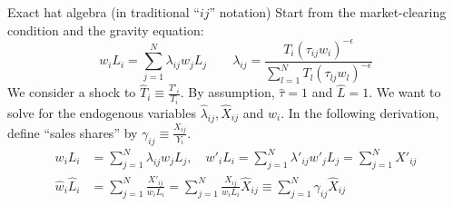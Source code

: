 \documentclass[10pt,notes=hide]{beamer}
\begin{document}
\begin{frame}{Exact hat algebra (in traditional ``$ij$'' notation)}
Start from the market-clearing condition and the gravity equation:
\begin{equation*}
w_i L_i
=
\sum_{j=1}^{N} \lambda_{ij} w_j L_j 
\quad \quad
\lambda_{ij} 
=
\frac{T_{i} \left(\tau_{ij}w_i\right)^{-\epsilon}}{\sum_{l=1}^{N} T_{l}  \left(\tau_{lj}w_l\right)^{-\epsilon}}
\end{equation*}
We consider a shock to $\hat{T}_{i} \equiv \frac{T'_{i}}{T_{i}}$.
By assumption, $\hat{\tau}=1$ and $\hat{L}=1$.
We want to solve for the endogenous variables $\hat{\lambda}_{ij}, \hat{X}_{ij}$ and $\hat{w}_{i}$.
In the following derivation, 
define ``sales shares'' by
$\gamma_{ij}\equiv\frac{X_{ij}}{Y_{i}}$.
\begin{align}
w_i L_i
&=
\sum_{j=1}^{N} \lambda_{ij} w_j L_j,
\quad
w'_i L_i
=
\sum_{j=1}^{N} \lambda'_{ij} w'_j L_j
=
\sum_{j=1}^{N} X'_{ij}
\nonumber \\
\hat{w}_i \hat{L}_i
&= 
\sum_{j=1}^{N} \frac{X'_{ij}}{w_i L_i}
=
\sum_{j=1}^{N} \frac{X_{ij}}{w_i L_i} \hat{X}_{ij}
\equiv
\sum_{j=1}^{N} \gamma_{ij} \hat{X}_{ij}  \label{eqn:20180428:1sector:hatincome}
\end{align}
\end{frame}
\end{document}
